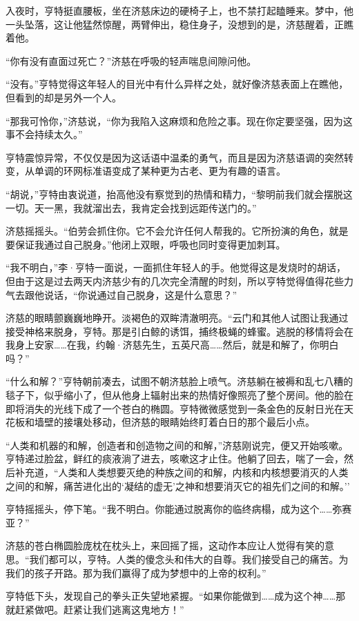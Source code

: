\documentclass[AutoFakeBold=true]{book}
\begin{document}
入夜时，亨特挺直腰板，坐在济慈床边的硬椅子上，也不禁打起瞌睡来。梦中，他一头坠落，这让他猛然惊醒，两臂伸出，稳住身子，没想到的是，济慈醒着，正瞧着他。

``你有没有直面过死亡？''济慈在呼吸的轻声喘息间隙问他。

``没有。''亨特觉得这年轻人的目光中有什么异样之处，就好像济慈表面上在瞧他，但看到的却是另外一个人。

``那我可怜你，''济慈说，``你为我陷入这麻烦和危险之事。现在你定要坚强，因为这事不会持续太久。''

亨特震惊异常，不仅仅是因为这话语中温柔的勇气，而且是因为济慈语调的突然转变，从单调的环网标准语变成了某种更为古老、更为有趣的语言。

``胡说，''亨特由衷说道，抬高他没有察觉到的热情和精力，``黎明前我们就会摆脱这一切。天一黑，我就溜出去，我肯定会找到远距传送门的。''

济慈摇摇头。``伯劳会抓住你。它不会允许任何人帮我的。它所扮演的角色，就是要保证我通过自己脱身。''他闭上双眼，呼吸也同时变得更加刺耳。

``我不明白，''李·亨特一面说，一面抓住年轻人的手。他觉得这是发烧时的胡话，但由于这是过去两天内济慈少有的几次完全清醒的时刻，所以亨特觉得值得花些力气去跟他说话，``你说通过自己脱身，这是什么意思？''

济慈的眼睛颤巍巍地睁开。淡褐色的双眸清澈明亮。``云门和其他人试图让我通过接受神格来脱身，亨特。那是引白鲸的诱饵，捕终极蝇的蜂蜜。逃脱的移情将会在我身上安家……在我，约翰·济慈先生，五英尺高……然后，就是和解了，你明白吗？''

``什么和解？''亨特朝前凑去，试图不朝济慈脸上喷气。济慈躺在被褥和乱七八糟的毯子下，似乎缩小了，但从他身上辐射出来的热情好像照亮了整个房间。他的脸在即将消失的光线下成了一个苍白的椭圆。亨特微微感觉到一条金色的反射日光在天花板和墙壁的接壤处移动，但济慈的眼睛始终盯着白日的那个最后小点。

``人类和机器的和解，创造者和创造物之间的和解，''济慈刚说完，便又开始咳嗽。亨特递过脸盆，鲜红的痰液淌了进去，咳嗽这才止住。他躺了回去，喘了一会，然后补充道，``人类和人类想要灭绝的种族之间的和解，内核和内核想要消灭的人类之间的和解，痛苦进化出的`凝结的虚无'之神和想要消灭它的祖先们之间的和解。''

亨特摇摇头，停下笔。``我不明白。你能通过脱离你的临终病榻，成为这个……弥赛亚？''

济慈的苍白椭圆脸庞枕在枕头上，来回摇了摇，这动作本应让人觉得有笑的意思。``我们都可以，亨特。人类的傻念头和伟大的自尊。我们接受自己的痛苦。为我们的孩子开路。那为我们赢得了成为梦想中的上帝的权利。''

亨特低下头，发现自己的拳头正失望地紧握。``如果你能做到……成为这个神……那就赶紧做吧。赶紧让我们逃离这鬼地方！''
\end{document}
